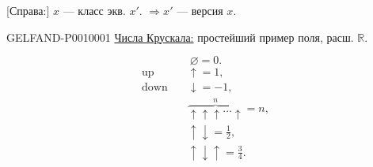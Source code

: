 [Справа:] $x$ --- класс экв. $x'$. $\Rightarrow x'$ --- версия $x$.


\begin{GelfandAdjacentEvidence}{GELFAND-P001000}{1}
\underline{Числа Крускала:} простейший пример поля, расш. $\mathbb R$.
\end{GelfandAdjacentEvidence}

\[
\varnothing=0.
\]
\[
\begin{aligned}
\text{up}\quad&\uparrow=1,\\
\text{down}\quad&\downarrow=-1,\\
&\overbrace{\uparrow\uparrow\uparrow\ldots\uparrow}^{n}=n,\\
&\uparrow\downarrow=\frac12,\\
&\uparrow\downarrow\uparrow=\frac34.
\end{aligned}
\]

